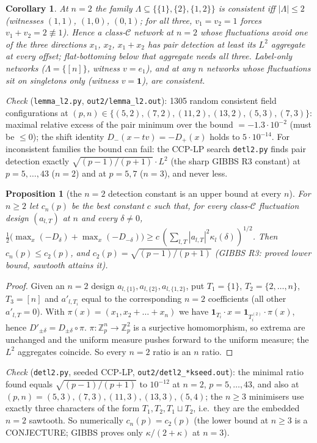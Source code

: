 \documentclass[11pt]{article}
\newtheorem{proposition}[theorem]{Proposition}
\newtheorem{corollary}[theorem]{Corollary}
\theoremstyle{remark}
\begin{document}
\begin{corollary}\label{cor:n2}
At $n=2$ the family $\Lambda\subseteq\{\{1\},\{2\},\{1,2\}\}$ is consistent iff $|\Lambda|\le2$ (witnesses $(1,1)$, $(1,0)$, $(0,1)$; for all three,
$v_1=v_2=1$ forces $v_1+v_2=2\not\equiv1$).  Hence a class-$\mathcal C$ network at $n=2$ whose fluctuations avoid one of the three directions
$x_1$, $x_2$, $x_1+x_2$ has pair detection at least its $L^2$ aggregate at every offset; flat-bottoming below that aggregate needs all three.
Label-only networks ($\Lambda=\{[n]\}$, witness $v=e_1$), and at any $n$ networks whose fluctuations sit on singletons only (witness $v=\mathbf 1$),
are consistent.
\end{corollary}

\emph{Check} (\texttt{lemma\_l2.py}, \texttt{out2/lemma\_l2.out}): 1305 random consistent field configurations at $(p,n)\in\{(5,2),(7,2),(11,2),(13,2),(5,3),(7,3)\}$:
maximal relative excess of the pair minimum over the bound $=-1.3\cdot10^{-2}$ (must be $\le0$); the shift identity $D_-(x-tv)=-D_+(x)$ holds to
$5\cdot10^{-14}$.  For inconsistent families the bound can fail: the CCP-LP search \texttt{detl2.py} finds pair detection exactly
$\sqrt{(p-1)/(p+1)}\cdot L^2$ (the sharp GIBBS R3 constant) at $p=5,\dots,43$ ($n=2$) and at $p=5,7$ ($n=3$), and never less.

\begin{proposition}[the $n=2$ detection constant is an upper bound at every $n$]\label{prop:embed}
For $n\ge2$ let $c_n(p)$ be the best constant $c$ such that, for every class-$\mathcal C$ fluctuation design $(a_{l,T})$ at $n$ and every $\delta\ne0$,
$\frac12\big(\max_x(-D_\delta)+\max_x(-D_{-\delta})\big)\ge c\,(\sum_{l,T}|a_{l,T}|^2\kappa_l(\delta))^{1/2}$.  Then $c_n(p)\le c_2(p)$, and
$c_2(p)=\sqrt{(p-1)/(p+1)}$ (GIBBS R3: proved lower bound, sawtooth attains it).
\end{proposition}
\begin{proof}
Given an $n=2$ design $a_{l,\{1\}},a_{l,\{2\}},a_{l,\{1,2\}}$, put $T_1=\{1\}$, $T_2=\{2,\dots,n\}$, $T_3=[n]$ and $a'_{l,T_i}$ equal to the corresponding $n=2$
coefficients (all other $a'_{l,T}=0$).  With $\pi(x)=(x_1,x_2+\dots+x_n)$ we have $\mathbf 1_{T_i}\cdot x=\mathbf 1_{T_i^{(2)}}\cdot\pi(x)$, hence
$D'_{\pm\delta}=D_{\pm\delta}\circ\pi$.  $\pi:\mathbb Z_p^n\to\mathbb Z_p^2$ is a surjective homomorphism, so extrema are unchanged and the uniform measure
pushes forward to the uniform measure; the $L^2$ aggregates coincide.  So every $n=2$ ratio is an $n$ ratio.
\end{proof}
\emph{Check} (\texttt{detl2.py}, seeded CCP-LP, \texttt{out2/detl2\_*kseed.out}): the minimal ratio found equals $\sqrt{(p-1)/(p+1)}$ to $10^{-12}$ at
$n=2$, $p=5,\dots,43$, and also at $(p,n)=(5,3),(7,3),(11,3),(13,3),(5,4)$; the $n\ge3$ minimisers use exactly three characters of the form
$T_1,T_2,T_1\sqcup T_2$, i.e.\ they are the embedded $n=2$ sawtooth.  So numerically $c_n(p)=c_2(p)$ (the lower bound at $n\ge3$ is a
CONJECTURE; GIBBS proves only $\kappa/(2+\kappa)$ at $n=3$).
\end{document}
